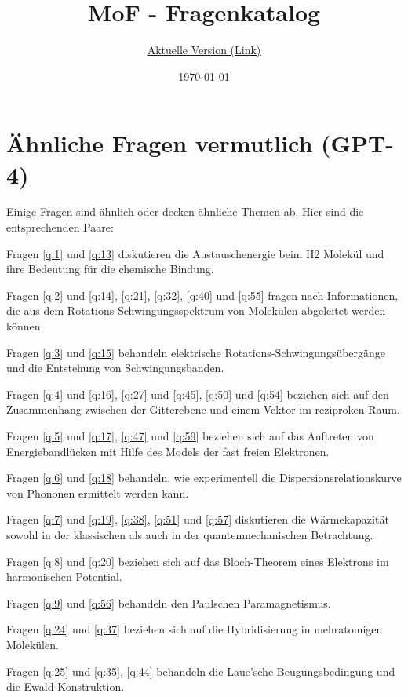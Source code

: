 \documentclass[a4paper, 11pt, ngerman, parskip=half-]{scrartcl}
\title{MoF - Fragenkatalog}
\subtitle{\href{https://github.com/Bierbunker/MoF-Ausarbeitung}{\underline{Aktuelle Version (Link)}}}
\date{\today}
\begin{document}
\maketitle

\newpage

\tableofcontents

\newpage
\section*{Ähnliche Fragen vermutlich (GPT-4)}

Einige Fragen sind ähnlich oder decken ähnliche Themen ab. Hier sind die entsprechenden Paare:

Fragen \ref{q:1} und \ref{q:13} diskutieren die Austauschenergie beim H2 Molekül und ihre Bedeutung für die chemische Bindung.

Fragen \ref{q:2} und \ref{q:14}, \ref{q:21}, \ref{q:32}, \ref{q:40} und \ref{q:55} fragen nach Informationen, die aus dem Rotations-Schwingungsspektrum von Molekülen abgeleitet werden können.

Fragen \ref{q:3} und \ref{q:15} behandeln elektrische Rotations-Schwingungsübergänge und die Entstehung von Schwingungsbanden.

Fragen \ref{q:4} und \ref{q:16}, \ref{q:27} und \ref{q:45}, \ref{q:50} und \ref{q:54} beziehen sich auf den Zusammenhang zwischen der Gitterebene und einem Vektor im reziproken Raum.

Fragen \ref{q:5} und \ref{q:17}, \ref{q:47} und \ref{q:59} beziehen sich auf das Auftreten von Energiebandlücken mit Hilfe des Models der fast freien Elektronen.

Fragen \ref{q:6} und \ref{q:18} behandeln, wie experimentell die Dispersionsrelationskurve von Phononen ermittelt werden kann.

Fragen \ref{q:7} und \ref{q:19}, \ref{q:38}, \ref{q:51} und \ref{q:57} diskutieren die Wärmekapazität sowohl in der klassischen als auch in der quantenmechanischen Betrachtung.

Fragen \ref{q:8} und \ref{q:20} beziehen sich auf das Bloch-Theorem eines Elektrons im harmonischen Potential.

Fragen \ref{q:9} und \ref{q:56} behandeln den Paulschen Paramagnetismus.

Fragen \ref{q:24} und \ref{q:37} beziehen sich auf die Hybridisierung in mehratomigen Molekülen.

Fragen \ref{q:25} und \ref{q:35}, \ref{q:44} behandeln die Laue'sche Beugungsbedingung und die Ewald-Konstruktion.
\end{document}
